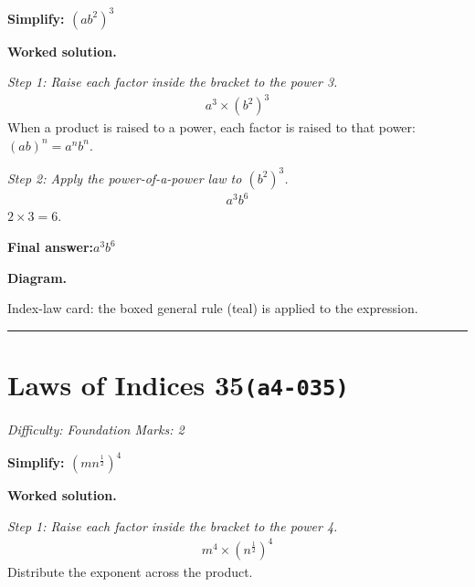 \documentclass[11pt]{article}
\newcommand{\question}[1]{\par\medskip\noindent\textbf{#1}\par}
\begin{document}
\question{Simplify: \( (ab^2)^3 \)}

\textbf{Worked solution.}

\textit{Step 1: Raise each factor inside the bracket to the power 3.}
\[\begin{gathered}
a^3 \times (b^2)^3
\end{gathered}\]
When a product is raised to a power, each factor is raised to that power: \( (ab)^n = a^n b^n \).

\textit{Step 2: Apply the power-of-a-power law to \( (b^2)^3 \).}
\[\begin{gathered}
a^3 b^{6}
\end{gathered}\]
\( 2 \times 3 = 6 \).

\begin{answerbox}
\textbf{Final answer:}\quad \(\displaystyle a^3 b^{6}\)
\end{answerbox}
\textbf{Diagram.}

\begin{center}
\end{center}
\small Index-law card: the boxed general rule (teal) is applied to the expression.\normalsize

\medskip\hrule

\section*{Laws of Indices 35\quad\small\texttt{(a4-035)}}
\textit{Difficulty: Foundation \quad\textbar\quad Marks: 2}

\question{Simplify: \( (mn^{\frac{1}{2}})^4 \)}

\textbf{Worked solution.}

\textit{Step 1: Raise each factor inside the bracket to the power 4.}
\[\begin{gathered}
m^4 \times (n^{\frac{1}{2}})^4
\end{gathered}\]
Distribute the exponent across the product.
\end{document}

